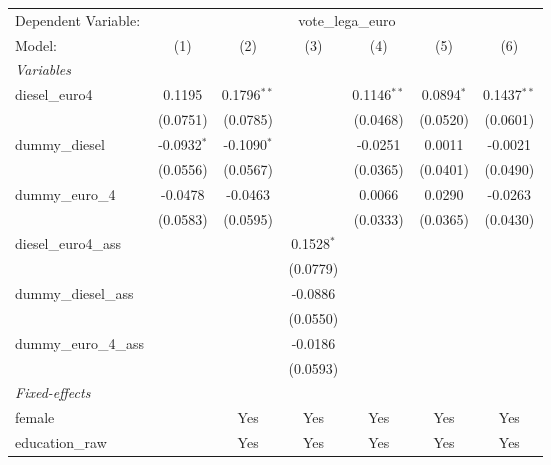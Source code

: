 \begingroup
\centering
\begin{tabular}{lcccccc}
   \tabularnewline \midrule \midrule
   Dependent Variable: & \multicolumn{6}{c}{vote\_lega\_euro}\\
   Model:                 & (1)           & (2)           & (3)          & (4)           & (5)          & (6)\\  
   \midrule
   \emph{Variables}\\
   diesel\_euro4          & 0.1195        & 0.1796$^{**}$ &              & 0.1146$^{**}$ & 0.0894$^{*}$ & 0.1437$^{**}$\\   
                          & (0.0751)      & (0.0785)      &              & (0.0468)      & (0.0520)     & (0.0601)\\   
   dummy\_diesel          & -0.0932$^{*}$ & -0.1090$^{*}$ &              & -0.0251       & 0.0011       & -0.0021\\   
                          & (0.0556)      & (0.0567)      &              & (0.0365)      & (0.0401)     & (0.0490)\\   
   dummy\_euro\_4         & -0.0478       & -0.0463       &              & 0.0066        & 0.0290       & -0.0263\\   
                          & (0.0583)      & (0.0595)      &              & (0.0333)      & (0.0365)     & (0.0430)\\   
   diesel\_euro4\_ass     &               &               & 0.1528$^{*}$ &               &              &   \\   
                          &               &               & (0.0779)     &               &              &   \\   
   dummy\_diesel\_ass     &               &               & -0.0886      &               &              &   \\   
                          &               &               & (0.0550)     &               &              &   \\   
   dummy\_euro\_4\_ass    &               &               & -0.0186      &               &              &   \\   
                          &               &               & (0.0593)     &               &              &   \\   
   \midrule
   \emph{Fixed-effects}\\
   female                 &               & Yes           & Yes          & Yes           & Yes          & Yes\\  
   education\_raw         &               & Yes           & Yes          & Yes           & Yes          & Yes\\  

\end{tabular}
